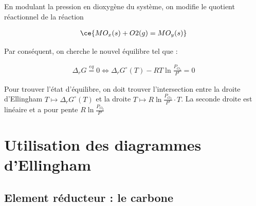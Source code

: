 \documentclass[a4paper]{book}
\begin{document}
En modulant la pression en dioxygène du système, on modifie le quotient réactionnel de la réaction 

\begin{align*}
\ce{MO_x (s) + O2(g) = MO_y (s)}
\end{align*}

Par conséquent, on cherche le nouvel équilibre tel que :

\begin{align*}
\Delta_r G \stackrel{eq}{=} 0 \iff \Delta_r G^\circ (T) -  RT \ln \frac{P_{O_2}}{P^\circ} = 0
\end{align*}

Pour trouver l'état d'équilibre, on doit trouver l'intersection entre la droite d'Ellingham $T \mapsto \Delta_r G^\circ (T)$ et la droite $T \mapsto R \ln\frac{P_{O_2}}{P^\circ} \cdot T$. La seconde droite est linéaire et a pour pente $R \ln \frac{P_{O_2}}{P^\circ}$


\section{Utilisation des diagrammes d'Ellingham}
\subsection{Element réducteur : le carbone}
\end{document}
